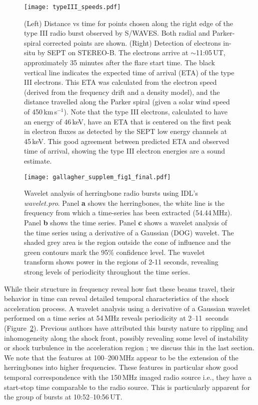 \begin{figure}[!t]
\begin{center}
\texttt{[image: typeIII\_speeds.pdf]}
\caption[Type III speeds]{(Left) Distance vs time for points chosen along the right edge of the type III radio burst observed by S/WAVES. Both radial and Parker-spiral corrected points are shown. (Right) Detection of electrons in-situ by SEPT on STEREO-B. The electrons arrive at $\sim$11:05\,UT, approximately 35 minutes after the flare start time. The black vertical line indicates the expected time of arrival (ETA) of the type III electrons. This ETA was calculated from the electron speed (derived from the frequency drift and a density model), and the distance travelled along the Parker spiral (given a solar wind speed of 450\,km\,s$^{-1}$). Note that the type III electrons, calculated to have an energy of 46\,keV, have an ETA that is centered on the first peak in electron fluxes as detected by the SEPT low energy channels at 45\,keV. This good agreement between predicted ETA and observed time of arrival, showing the type III electron energies are a sound estimate.}
\label{fig:typeIII_speeds}
\end{center}
\end{figure}


\begin{figure}[!t]
\begin{center}
\texttt{[image: gallagher\_supplem\_fig1\_final.pdf]}
\caption[Herringbone wavelet analysis]{Wavelet analysis of herringbone radio bursts using IDL's \emph{wavelet.pro}. Panel {\bf a} shows the herringbones, the white line is the frequency from which a time-series has been extracted (54.44\,MHz). Panel {\bf b} shows the time series. Panel {\bf c} shows a wavelet analysis of the time series using a derivative of a Gaussian (DOG) wavelet. The shaded grey area is the region outside the cone of influence and the green contours mark the 95\% confidence level. The wavelet transform shows power in the regions of 2-11 seconds, revealing strong levels of periodicity throughout the time series.}
\label{fig:wavelet}
\end{center}
\end{figure}

While their structure in frequency reveal how fast these beams travel, their behavior in time can reveal detailed temporal characteristics of the shock acceleration process.
A wavelet analysis using a derivative of a Gaussian wavelet performed on a time series at 54\,MHz reveals periodicity at 2--11~seconds (Figure~\ref{fig:wavelet}). Previous authors have attributed this bursty nature to rippling and inhomogeneity along the shock front, possibly revealing some level of instability or shock turbulence in the acceleration region \citep{burgess2006, guo2010}; we discuss this in the last section. We note that the features at 100--200\,MHz appear to be the extension of the herringbones into higher frequencies. These features in particular show good temporal correspondence with the 150\,MHz imaged radio source i.e., they have a start-stop time comparable to the radio source. This is particularly apparent for the group of bursts at 10:52--10:56\,UT.

